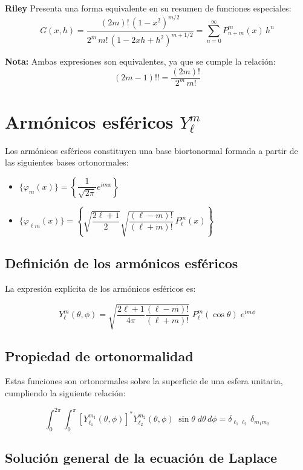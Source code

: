 \documentclass[a4paper]{article}
\begin{document}
\textbf{Riley}
Presenta una forma equivalente en su resumen de funciones especiales:
$$
G(x, h) = \frac{(2m)! \, (1 - x^2)^{m/2}}{2^m \, m! \, (1 - 2xh + h^2)^{m+1/2}} = \sum_{n=0}^\infty P_{n+m}^m(x) \, h^n
$$

\medskip
\textbf{Nota:} Ambas expresiones son equivalentes, ya que se cumple la relación:
$$
(2m-1)!! = \frac{(2m)!}{2^m \, m!}
$$


\section{Armónicos esféricos $Y_\ell^m$}

Los armónicos esféricos constituyen una base biortonormal formada a partir de las siguientes bases ortonormales:

\begin{itemize}
    \item $\{\varphi_m(x)\} = \left\{ \dfrac{1}{\sqrt{2\pi}} e^{i m x} \right\}$
    \item $\{\varphi_{\ell m}(x)\} = \left\{ \sqrt{\dfrac{2\ell+1}{2}} \sqrt{\dfrac{(\ell-m)!}{(\ell+m)!}} \, P_\ell^m(x) \right\}$
\end{itemize}

\subsection{Definición de los armónicos esféricos}

La expresión explícita de los armónicos esféricos es:

$$
Y_\ell^m(\theta, \phi) = \sqrt{\frac{2\ell+1}{4\pi} \frac{(\ell-m)!}{(\ell+m)!}} \; P_\ell^m(\cos \theta) \; e^{i m \phi}
$$

\subsection{Propiedad de ortonormalidad}

Estas funciones son ortonormales sobre la superficie de una esfera unitaria, cumpliendo la siguiente relación:

$$
\int_{0}^{2\pi} \int_{0}^{\pi} \left[ Y_{\ell_1}^{m_1}(\theta, \phi) \right]^* Y_{\ell_2}^{m_2}(\theta, \phi) \; \sin \theta \; d\theta \, d\phi = \delta_{\ell_1 \ell_2} \, \delta_{m_1 m_2}
$$

\subsection{Solución general de la ecuación de Laplace}
\end{document}
